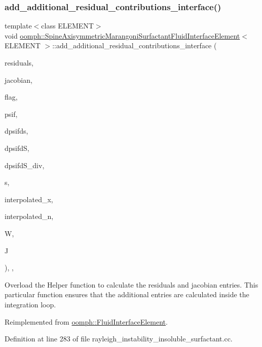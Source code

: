 \subsubsection{\texorpdfstring{add\+\_\+additional\+\_\+residual\+\_\+contributions\+\_\+interface()}{add\_additional\_residual\_contributions\_interface()}}
{\footnotesize\ttfamily template$<$class E\+L\+E\+M\+E\+NT$>$ \\
void \hyperlink{classoomph_1_1SpineAxisymmetricMarangoniSurfactantFluidInterfaceElement}{oomph\+::\+Spine\+Axisymmetric\+Marangoni\+Surfactant\+Fluid\+Interface\+Element}$<$ E\+L\+E\+M\+E\+NT $>$\+::add\+\_\+additional\+\_\+residual\+\_\+contributions\+\_\+interface (\begin{DoxyParamCaption}\item[{Vector$<$ double $>$ \&}]{residuals,  }\item[{Dense\+Matrix$<$ double $>$ \&}]{jacobian,  }\item[{const unsigned \&}]{flag,  }\item[{const Shape \&}]{psif,  }\item[{const D\+Shape \&}]{dpsifds,  }\item[{const D\+Shape \&}]{dpsifdS,  }\item[{const D\+Shape \&}]{dpsifd\+S\+\_\+div,  }\item[{const Vector$<$ double $>$ \&}]{s,  }\item[{const Vector$<$ double $>$ \&}]{interpolated\+\_\+x,  }\item[{const Vector$<$ double $>$ \&}]{interpolated\+\_\+n,  }\item[{const double \&}]{W,  }\item[{const double \&}]{J }\end{DoxyParamCaption})\hspace{0.3cm}{\ttfamily [inline]}, {\ttfamily [protected]}, {\ttfamily [virtual]}}



Overload the Helper function to calculate the residuals and jacobian entries. This particular function ensures that the additional entries are calculated inside the integration loop. 



Reimplemented from \hyperlink{classoomph_1_1FluidInterfaceElement_a0bc278bb201b861f47dc846453be4c06}{oomph\+::\+Fluid\+Interface\+Element}.



Definition at line 283 of file rayleigh\+\_\+instability\+\_\+insoluble\+\_\+surfactant.\+cc.

